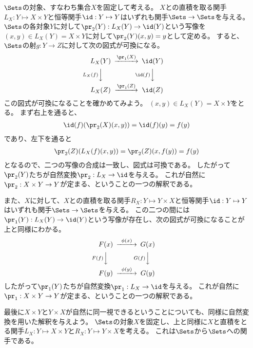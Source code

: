 \documentclass[uplatex]{jsarticle}
\begin{document}
$\Sets$の対象、すなわち集合$X$を固定して考える。
$X$との直積を取る関手$L_X:Y \mapsto X \times Y$と恒等関手$\id:Y \mapsto Y$はいずれも関手$\Sets \to \Sets$を与える。
$\Sets$の各対象$Y$に対して$\pr_2(Y):L_X(Y) \to \id(Y)$という写像を$(x,y) \in L_X(Y)=X\times Y$に対して$\pr_2(Y)(x,y)=y$として定める。
すると、$\Sets$の射$g:Y \to Z$に対して次の図式が可換になる。
\[
\begin{CD}
L_X(Y)@>\pr_1(X)>>\id(Y)\\
@VL_X(f)VV@V\id(f)VV\\
L_X(Z)@>\pr_1(Z)>>\id(Z)
\end{CD}
\]
この図式が可換になることを確かめてみよう。
$(x,y) \in L_X(Y)=X\times Y$をとる。
まず右上を通ると、
\begin{align*}
\id(f)(\pr_2(X)(x,y))=\id(f)(y)=f(y)
\end{align*}
であり、左下を通ると
\begin{align*}
\pr_2(Z)(L_X(f)(x,y))=\pr_2(Z)(x,f(y))=f(y)
\end{align*}
となるので、二つの写像の合成は一致し、図式は可換である。
したがって$\pr_2(Y)$たちが自然変換$\pr_2:L_X \to \id$を与える。
これが自然に$\pr_2:X \times Y \to Y$が定まる、ということの一つの解釈である。

また、$X$に対して、$X$との直積を取る関手$R_X:Y \mapsto Y \times X$と恒等関手$\id:Y \mapsto Y$はいずれも関手$\Sets \to \Sets$を与える。
この二つの間には$\pr_1(Y):L_X(Y) \to \id(Y)$という写像が存在し、次の図式が可換になることが上と同様にわかる。
\[
\begin{CD}
F(x)@>\phi(x)>>G(x)\\
@VF(f)VV@VG(f)VV\\
F(y)@>\phi(y)>>G(y)
\end{CD}
\]
したがって$\pr_1(Y)$たちが自然変換$\pr_1:L_X \to \id$を与える。
これが自然に$\pr_1:X \times Y \to Y$が定まる、ということの一つの解釈である。

最後に$X \times Y$と$Y \times X$が自然に同一視できるということについても、同様に自然変換を用いた解釈を与えよう。
$\Sets$の対象$X$を固定し、上と同様に$X$と直積をとる関手$L_X:Y \mapsto X \times Y$と$R_X:Y \mapsto Y \times X$を考える。
これは$\Sets$から$\Sets$への関手である。
\end{document}

